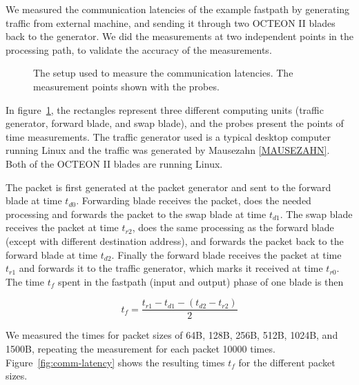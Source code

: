 We measured the communication latencies of the example fastpath by generating traffic from external machine, and sending it through two OCTEON II blades back to the generator. We did the measurements at two independent points in the processing path, to validate the accuracy of the measurements.

\begin{figure}[ht]
  \begin{center}
    
    \caption{The setup used to measure the communication latencies. The measurement points shown with the probes.}
    \label{fig:comm-setup}
  \end{center}
\end{figure}

In figure~\ref{fig:comm-setup}, the rectangles represent three different computing units (traffic generator, forward blade, and swap blade), and the probes present the points of time measurements. The traffic generator used is a typical desktop computer running Linux and the traffic was generated by Mausezahn \ref{MAUSEZAHN}. Both of the OCTEON II blades are running Linux.

The packet is first generated at the packet generator and sent to the forward blade at time $t_{d0}$. Forwarding blade receives the packet, does the needed processing and forwards the packet to the swap blade at time $t_{d1}$. The swap blade receives the packet at time $t_{r2}$, does the same processing as the forward blade (except with different destination address), and forwards the packet back to the forward blade at time $t_{d2}$. Finally the forward blade receives the packet at time $t_{r1}$ and forwards it to the traffic generator, which marks it received at time $t_{r0}$. The time $t_{f}$ spent in the fastpath (input and output) phase of one blade is then

\begin{equation}
  \label{eq:1}
  t_{f} = \frac{t_{r1} - t_{d1} - (t_{d2} - t_{r2})}{2}
\end{equation}

We measured the times for packet sizes of 64B, 128B, 256B, 512B, 1024B, and 1500B, repeating the measurement for each packet 10000 times. Figure~\ref{fig:comm-latency} shows the resulting times $t_{f}$ for the different packet sizes.

